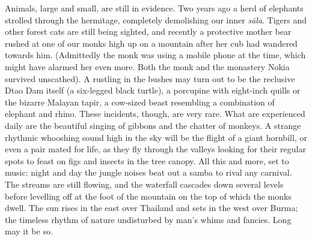 Animals, large and small, are still in evidence. Two years ago a herd of
elephants strolled through the hermitage, completely demolishing our
inner \emph{sāla}. Tigers and other forest cats are still being sighted, and
recently a protective mother bear rushed at one of our monks high up on
a mountain after her cub had wandered towards him. (Admittedly the monk
was using a mobile phone at the time, which might have alarmed her even
more. Both the monk and the monastery Nokia survived unscathed). A
rustling in the bushes may turn out to be the reclusive Dtao Dam itself
 (a six-legged black turtle), a porcupine with eight-inch quills or the
bizarre Malayan tapir, a cow-sized beast resembling a combination of
elephant and rhino. These incidents, though, are very rare. What are
experienced daily are the beautiful singing of gibbons and the chatter
of monkeys. A strange rhythmic whooshing sound high in the sky will be
the flight of a giant hornbill, or even a pair mated for life, as they
fly through the valleys looking for their regular spots to feast on figs
and insects in the tree canopy. All this and more, set to music: night
and day the jungle noises beat out a samba to rival any carnival. The
streams are still flowing, and the waterfall cascades down several
levels before levelling off at the foot of the mountain on the top of
which the monks dwell. The sun rises in the east over Thailand and sets
in the west over Burma; the timeless rhythm of nature undisturbed by
man's whims and fancies. Long may it be so. 

